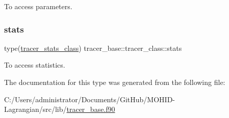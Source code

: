 To access parameters. 

\mbox{\label{structtracer__base_1_1tracer__class_a44167d106dc210e434106087e4a19578}} 
\subsubsection{\texorpdfstring{stats}{stats}}
{\footnotesize\ttfamily type(\hyperlink{structtracer__base_1_1tracer__stats__class}{tracer\+\_\+stats\+\_\+class}) tracer\+\_\+base\+::tracer\+\_\+class\+::stats\hspace{0.3cm}{\ttfamily [private]}}



To access statistics. 



The documentation for this type was generated from the following file\+:\begin{DoxyCompactItemize}
\item 
C\+:/\+Users/administrator/\+Documents/\+Git\+Hub/\+M\+O\+H\+I\+D-\/\+Lagrangian/src/lib/\hyperlink{tracer__base_8f90}{tracer\+\_\+base.\+f90}\end{DoxyCompactItemize}
